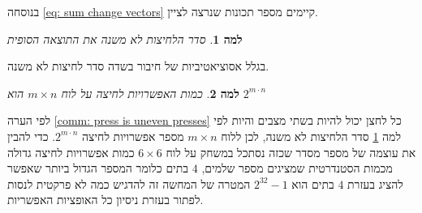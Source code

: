 \documentclass[12pt,leqno]{article}
\theoremstyle{theoremdd}
\newtheorem{lemma}{למה}[section]
\begin{document}
בנוסחה
\ref{eq: sum change vectors}
קיימים מספר תכונות 
שנרצה לציין.
\begin{lemma}
    \label{lemma: order presses}
    סדר הלחיצות לא משנה את התוצאה הסופית
\end{lemma}
בגלל אסוציאטיביות של חיבור בשדה 
סדר לחיצות לא משנה.
\begin{lemma}
    \label{lemma: num presses}
    כמות האפשרויות לחיצה על לוח
    $m \times n$
    הוא 
    $2^{m \cdot n}$
\end{lemma}
לפי הערה 
\ref{comm: press is uneven presses}
כל לחצן יכול להיות בשתי מצבים 
והיות לפי
למה
\ref{lemma: order presses}
סדר הלחיצות לא משנה,
לכן ללוח
$m \times n$
מספר אפשרויות לחיצה 
$2^{m \cdot n}$.
כדי להבין את עוצמה של מספר מסדר שכזה נסתכל במשחק על לוח 
$6 \times 6$
כמות  אפשרויות לחיצה גדולה 
מכמות הסטנדרטית שמציגים מספר שלמים,
$4$
בתים
כלומר המספר הגדול ביותר שאפשר להציג  בעזרת 
$4$
בתים
הוא
$2^{32}-1$
המטרה של המחשה זה להדגיש כמה לא פרקטית לנסות לפתור בעזרת
ניסיון כל האופציות האפשריות.
\end{document}
